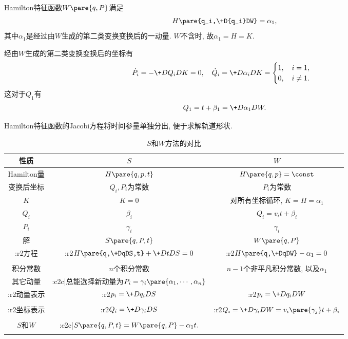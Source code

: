 \documentclass[../TheoreticalMechanics.tex]{subfiles}
\begin{document}
\begin{finale}
    \begin{theorem}
        Hamilton特征函数$W\pare{q,P}$满足
        \[ H\pare{q_i,\+D{q_i}DW} = \alpha_1, \]
        其中$\alpha_1$是经过由$W$生成的第二类变换变换后的一动量. $W$不含时, 故$\alpha_1=H=K$.
    \end{theorem}
\end{finale}
\begin{lemma}[Hamilton特征函数变换后坐标]
    \label{lem:Hamilton特征函数变换后坐标}
    经由$W$生成的第二类变换变换后的坐标有
    \[ \dot{P}_i = -\+D{Q_i}DK = 0, \quad \dot{Q}_i = \+D{\alpha_i}DK = \begin{cases}
        1,\quad i=1,\\
        0,\quad i\neq 1.
    \end{cases} \]
    这对于$Q_1$有
    \[ Q_1 = t+\beta_1 = \+D{\alpha_1}DW. \]
\end{lemma}
\begin{remark}
    Hamilton特征函数的Jacobi方程将时间参量单独分出, 便于求解轨道形状.
\end{remark}
\begin{longtable}{|c|c|c|}
    \hline
    性质 & $S$ & $W$ \\
    \hline
    Hamilton量 & $H\pare{q,p,t}$ & $H\pare{q,p}=\const$ \\
    \hline
    变换后坐标 & $Q_i,P_i$为常数 & $P_i$为常数 \\
    \hline
    $K$ & $K=0$ & 对所有坐标循环, $K=H=\alpha_1$ \\
    \hline
    $Q_i$ & $\beta_i$ & $Q_i = v_i t+\beta_i$ \\
    \hline
    $P_i$ & $\gamma_i$ & $\gamma_i$ \\
    \hline
    解 & $S\pare{q,P,t}$ & $W\pare{q,P}$ \\
    \hline
    \+:r2{方程} & \+:r2{$\displaystyle H\pare{q,\+DqDS,t}+\+DtDS=0$} & \+:r2{$\displaystyle H\pare{q,\+DqDW}-\alpha_1 = 0$} \\
    & & \\
    \hline
    积分常数 & $n$个积分常数 & $n-1$个非平凡积分常数, 以及$\alpha_1$ \\
    \hline
    其它动量 & \+:c2{c|}{总能选择新动量为$P_i = \gamma_i\pare{\alpha_1,\cdots,\alpha_n}$} \\
    \hline
    \+:r2{动量表示} & \+:r2{$\displaystyle p_i = \+D{q_i}DS$} & \+:r2{$\displaystyle p_i = \+D{q_i}DW$} \\
    & & \\
    \hline
    \+:r2{坐标表示} & \+:r2{$\displaystyle Q_i = \+D{\gamma_i}DS$} & \+:r2{$\displaystyle Q_i = \+D{\gamma_i}DW = v_i\pare{\gamma_j}t+\beta_i$} \\
    & & \\
    \hline
    $S$和$W$ & \+:c2{c|}{$S\pare{q,P,t}=W\pare{q,P} - \alpha_1 t.$} \\
    \hline
    \caption{$S$和$W$方法的对比}
\end{longtable}
\end{document}
